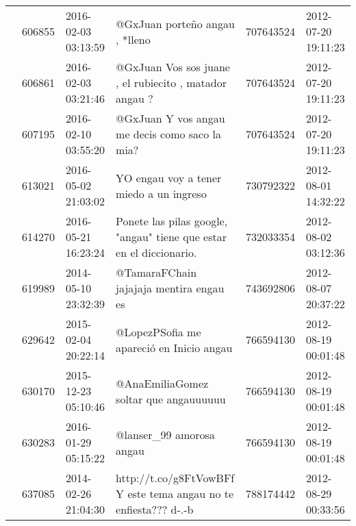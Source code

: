 \begin{tabular}{llllrl}
           & 606855  & 2016-02-03 03:13:59 &                                                                                                               @GxJuan porteño angau , *lleno &   707643524 & 2012-07-20 19:11:23 \\
           & 606861  & 2016-02-03 03:21:46 &                                                                                       @GxJuan Vos sos juane , el rubiecito , matador angau ? &   707643524 & 2012-07-20 19:11:23 \\
           & 607195  & 2016-02-10 03:55:20 &                                                                                               @GxJuan Y vos angau me decis como saco la mia? &   707643524 & 2012-07-20 19:11:23 \\
           & 613021  & 2016-05-02 21:03:02 &                                                                                                      YO engau voy a tener miedo a un ingreso &   730792322 & 2012-08-01 14:32:22 \\
           & 614270  & 2016-05-21 16:23:24 &                                                                          Ponete las pilas google, "angau" tiene que estar en el diccionario. &   732033354 & 2012-08-02 03:12:36 \\
           & 619989  & 2014-05-10 23:32:39 &                                                                                                      @TamaraFChain jajajaja mentira engau es &   743692806 & 2012-08-07 20:37:22 \\
           & 629642  & 2015-02-04 20:22:14 &                                                                                                     @LopezPSofia me apareció en Inicio angau &   766594130 & 2012-08-19 00:01:48 \\
           & 630170  & 2015-12-23 05:10:46 &                                                                                                        @AnaEmiliaGomez soltar que angauuuuuu &   766594130 & 2012-08-19 00:01:48 \\
           & 630283  & 2016-01-29 05:15:22 &                                                                                                                     @lanser\_99 amorosa angau &   766594130 & 2012-08-19 00:01:48 \\
           & 637085  & 2014-02-26 21:04:30 &                                                                             http://t.co/g8FtVowBFf Y este tema angau no te enfiesta??? d-.-b &   788174442 & 2012-08-29 00:33:56 \\

\end{tabular}
